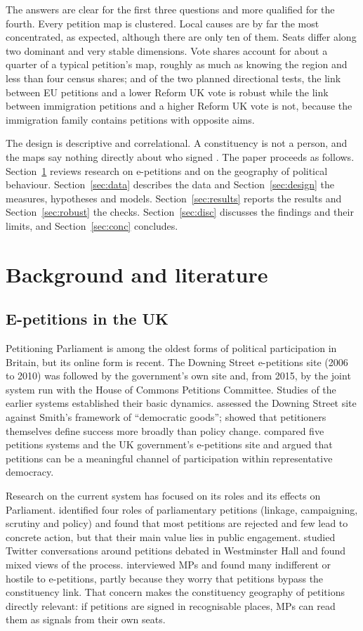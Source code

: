 \documentclass[11pt,a4paper]{article}
\begin{document}
The answers are clear for the first three questions and more qualified for the fourth. Every petition map is clustered. Local causes are by far the most concentrated, as expected, although there are only ten of them. Seats differ along two dominant and very stable dimensions. Vote shares account for about a quarter of a typical petition's map, roughly as much as knowing the region and less than four census shares; and of the two planned directional tests, the link between EU petitions and a lower Reform UK vote is robust while the link between immigration petitions and a higher Reform UK vote is not, because the immigration family contains petitions with opposite aims.

The design is descriptive and correlational. A constituency is not a person, and the maps say nothing directly about who signed \citep{robinson1950}. The paper proceeds as follows. Section~\ref{sec:lit} reviews research on e-petitions and on the geography of political behaviour. Section~\ref{sec:data} describes the data and Section~\ref{sec:design} the measures, hypotheses and models. Section~\ref{sec:results} reports the results and Section~\ref{sec:robust} the checks. Section~\ref{sec:disc} discusses the findings and their limits, and Section~\ref{sec:conc} concludes.

\section{Background and literature}\label{sec:lit}
\subsection{E-petitions in the UK}
Petitioning Parliament is among the oldest forms of political participation in Britain, but its online form is recent. The Downing Street e-petitions site (2006 to 2010) was followed by the government's own site and, from 2015, by the joint system run with the House of Commons Petitions Committee. Studies of the earlier systems established their basic dynamics. \citet{wright2012} assessed the Downing Street site against Smith's framework of ``democratic goods''; \citet{wright2016} showed that petitioners themselves define success more broadly than policy change. \citet{bochel2013} compared five petitions systems and the UK government's e-petitions site and argued that petitions can be a meaningful channel of participation within representative democracy.

Research on the current system has focused on its roles and its effects on Parliament. \citet{lestonbandeira2019} identified four roles of parliamentary petitions (linkage, campaigning, scrutiny and policy) and found that most petitions are rejected and few lead to concrete action, but that their main value lies in public engagement. \citet{asher2019} studied Twitter conversations around petitions debated in Westminster Hall and found mixed views of the process. \citet{matthews2021} interviewed MPs and found many indifferent or hostile to e-petitions, partly because they worry that petitions bypass the constituency link. That concern makes the constituency geography of petitions directly relevant: if petitions are signed in recognisable places, MPs can read them as signals from their own seats.
\end{document}
